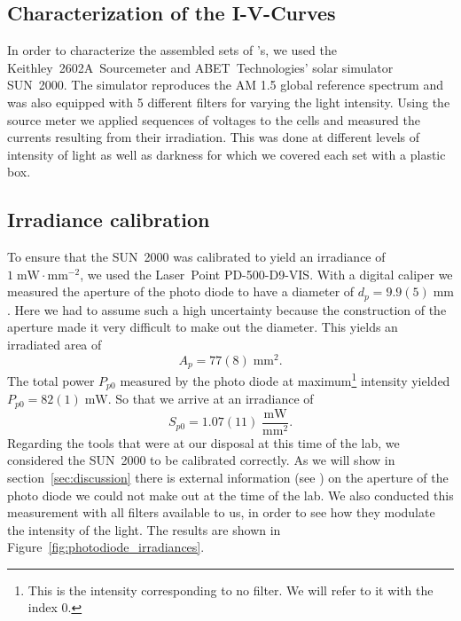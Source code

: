 \documentclass[a4paper,10pt,twocolumn]{article}
\begin{document}
\begin{extract*}

\section{Characterization of the I-V-Curves}\label{sec:charac}

In order to characterize the assembled sets of \BHSC's, we used the Keithley~2602A~Sourcemeter and ABET~Technologies’ solar simulator SUN~2000. The simulator reproduces the AM 1.5 global reference spectrum and was also equipped with 5 different filters for varying the light intensity. Using the source meter we applied sequences of voltages to the cells and measured the currents resulting from their irradiation. This was done at different levels of intensity of light as well as darkness for which we covered each set with a plastic box.
\subsection{Irradiance calibration}
To ensure that the SUN~2000 was calibrated to yield an irradiance of $1\;\text{mW}\!\cdot\text{mm}^{-2}$, we used the Laser~Point PD-500-D9-VIS. With a digital caliper we measured the aperture of the photo diode to have a diameter of $d_p = 9.9(5)\;\text{mm}$. Here we had to assume such a high uncertainty because the construction of the aperture made it very difficult to make out the diameter. This yields an irradiated area of
\begin{equation*}
	A_p =  77(8)\;\text{mm}^2.
\end{equation*}
The total power $P_{p0}$ measured by the photo diode at maximum\footnote{This is the intensity corresponding to no filter. We will refer to it with the index 0.} intensity yielded $P_{p0} = 82(1)\;\text{mW}$. So that we arrive at an irradiance of
\begin{equation*}
	S_{p0} = 1.07(11)\;\frac{\text{mW}}{\text{mm}^2}.
\end{equation*}
Regarding the tools that were at our disposal at this time of the lab, we considered the SUN~2000 to be calibrated correctly. As we will show in section~\ref{sec:discussion} there is external information (see \cite{photodiode}) on the aperture of the photo diode we could not make out at the time of the lab.\mypar
We also conducted this measurement with all filters available to us, in order to see how they modulate the intensity of the light. The results are shown in Figure~\ref{fig:photodiode_irradiances}.


\end{extract*}
\end{document}
